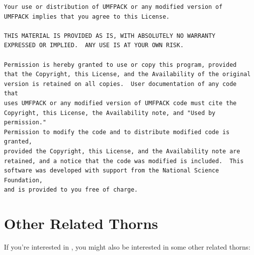 \begin{verbatim}
Your use or distribution of UMFPACK or any modified version of
UMFPACK implies that you agree to this License.

THIS MATERIAL IS PROVIDED AS IS, WITH ABSOLUTELY NO WARRANTY
EXPRESSED OR IMPLIED.  ANY USE IS AT YOUR OWN RISK.

Permission is hereby granted to use or copy this program, provided
that the Copyright, this License, and the Availability of the original
version is retained on all copies.  User documentation of any code that
uses UMFPACK or any modified version of UMFPACK code must cite the
Copyright, this License, the Availability note, and "Used by permission."
Permission to modify the code and to distribute modified code is granted,
provided the Copyright, this License, and the Availability note are
retained, and a notice that the code was modified is included.  This
software was developed with support from the National Science Foundation,
and is provided to you free of charge.
\end{verbatim}


\section{Other Related Thorns}

If you're interested in , you might also be
interested in some other related thorns:

